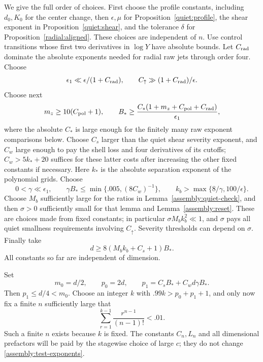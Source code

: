 We give the full order of choices. First choose the profile constants,
including $d_0,K_0$ for the center change, then $\epsilon,\mu$ for
Proposition~\ref{quiet:profile}, the shear exponent in
Proposition~\ref{quiet:shear}, and the tolerance $\delta$ for
Proposition~\ref{radial:aligned}. These choices are independent of $n$.
Use control transitions whose first two derivatives in $\log Y$ have
absolute bounds. Let $C_{\rm rad}$ dominate the absolute exponents
needed for radial raw jets through order four. Choose
\begin{equation}\label{assembly:first-constants}
 \epsilon_1\ll\epsilon/(1+C_{\rm rad}),\qquad
 C_\uparrow\gg(1+C_{\rm rad})/\epsilon.
\end{equation}
Choose next
\begin{equation}\label{assembly:second-constants}
 m_z\geq10(C_{\rm pol}+1),\qquad
 B_*\geq\frac{C_*(1+m_z+C_{\rm pol}+C_{\rm rad})}{\epsilon_1},
\end{equation}
where the absolute $C_*$ is large enough for the finitely many raw
exponent comparisons below. Choose $C_s$ larger than the quiet shear
severity exponent, and $C_w$ large enough to pay the shell loss and
four derivatives of its cutoffs; $C_w>5k_*+20$ suffices for these latter
costs after increasing the other fixed constants if necessary. Here
$k_*$ is the absolute separation exponent of the polynomial grids.
Choose
\begin{equation}\label{assembly:gamma-kb}
 0<\gamma\ll\epsilon_1,\qquad
 \gamma B_*\leq\min\{.005,(8C_w)^{-1}\},\qquad
 k_b>\max\{8/\gamma,100/\epsilon\}.
\end{equation}
Choose $M_b$ sufficiently large for the ratios in
Lemma~\ref{assembly:quiet-check}, and then $\sigma>0$ sufficiently small
for that lemma and Lemma~\ref{assembly:reset}. These are choices made
from fixed constants; in particular
$\sigma M_bk_b^2\ll1$, and $\sigma$ pays all quiet smallness requirements
involving $C_\uparrow$. Severity thresholds can depend on $\sigma$.
Finally take
\begin{equation}\label{assembly:depth}
 d\geq8(M_bk_b+C_s+1)B_*.
\end{equation}
All constants so far are independent of dimension.

Set
\begin{equation}\label{assembly:test-exponents}
 m_0=d/2,\qquad p_0=2d,\qquad
 p_1=C_sB_*+C_wd\gamma B_*.
\end{equation}
Then $p_1\leq d/4<m_0$. Choose an integer $k$ with
$.99k>p_0+p_1+1$, and only now fix a finite $n$ sufficiently large that
\begin{equation}\label{assembly:dimension}
 \sum_{r=1}^{k-1}\frac{r^{n-1}}{(n-1)!}<.01.
\end{equation}
Such a finite $n$ exists because $k$ is fixed. The constants $C_n,L_n$
and all dimensional prefactors will be paid by the stagewise choice
of large $c$; they do not change \eqref{assembly:test-exponents}.

